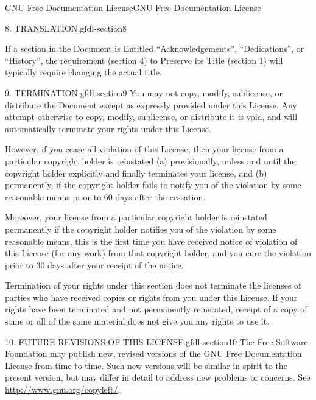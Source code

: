 \documentclass[10pt,]{book}
\numberwithin{equation}{section}
\begin{document}
\begin{appendixptx}{GNU Free Documentation License}{}{GNU Free Documentation License}{}{}
\begin{paragraphs}{8. TRANSLATION.}{gfdl-section8}
\par
\hypertarget{p-1357}{}%
If a section in the Document is Entitled ``Acknowledgements'', ``Dedications'', or ``History'', the requirement (section 4) to Preserve its Title (section 1) will typically require changing the actual title.%
\end{paragraphs}%
\begin{paragraphs}{9. TERMINATION.}{gfdl-section9}%
\hypertarget{p-1358}{}%
You may not copy, modify, sublicense, or distribute the Document except as expressly provided under this License. Any attempt otherwise to copy, modify, sublicense, or distribute it is void, and will automatically terminate your rights under this License.%
\par
\hypertarget{p-1359}{}%
However, if you cease all violation of this License, then your license from a particular copyright holder is reinstated (a) provisionally, unless and until the copyright holder explicitly and finally terminates your license, and (b) permanently, if the copyright holder fails to notify you of the violation by some reasonable means prior to 60 days after the cessation.%
\par
\hypertarget{p-1360}{}%
Moreover, your license from a particular copyright holder is reinstated permanently if the copyright holder notifies you of the violation by some reasonable means, this is the first time you have received notice of violation of this License (for any work) from that copyright holder, and you cure the violation prior to 30 days after your receipt of the notice.%
\par
\hypertarget{p-1361}{}%
Termination of your rights under this section does not terminate the licenses of parties who have received copies or rights from you under this License. If your rights have been terminated and not permanently reinstated, receipt of a copy of some or all of the same material does not give you any rights to use it.%
\end{paragraphs}%
\begin{paragraphs}{10. FUTURE REVISIONS OF THIS LICENSE.}{gfdl-section10}%
\hypertarget{p-1362}{}%
The Free Software Foundation may publish new, revised versions of the GNU Free Documentation License from time to time. Such new versions will be similar in spirit to the present version, but may differ in detail to address new problems or concerns. See \url{http://www.gnu.org/copyleft/}.%
\par
\hypertarget{p-1363}{}%

\end{paragraphs}
\end{appendixptx}
\end{document}
